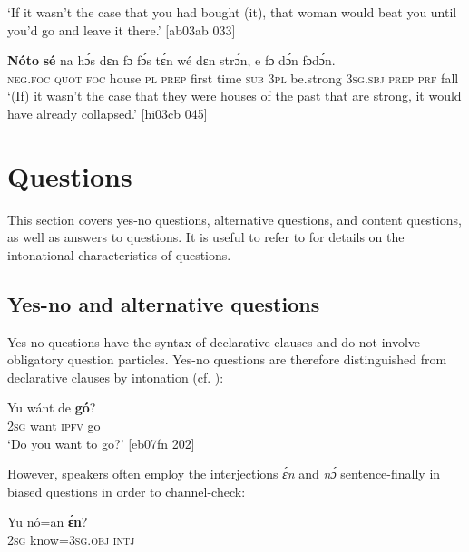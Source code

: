 \glt ‘If it wasn’t the case that you had bought (it), that woman would 
beat you until you’d go and leave it there.’ [ab03ab 033]
\z


\ea%
    \label{ex:key:581}
    \gll \textbf{Nóto}  \textbf{sé}    na  hɔ́s    dɛn  fɔ  fɔ́s  tɛ́n    wé  dɛn  strɔ́n,
e    fɔ  dɔ́n  fɔdɔ́n.\\
\textsc{neg}.\textsc{foc}  \textsc{quot}    \textsc{foc}  house  \textsc{pl}  \textsc{prep}  first time  \textsc{sub}  \textsc{3pl}  be.strong
\textsc{3sg.sbj}  \textsc{prep}  \textsc{prf}  fall\\

\glt ‘(If) it wasn’t the case that they were houses of the past that 
are strong, it would have already collapsed.’ [hi03cb 045]
\z

\section{Questions}\label{sec:7.3}

This section covers yes-no questions, alternative questions, and content questions, as well as answers to questions. It is useful to refer to  for details on the intonational characteristics of questions. 

\subsection{Yes-no and alternative questions}

Yes-no questions have the syntax of declarative clauses and do not involve obligatory question particles. Yes-no questions are therefore distinguished from declarative clauses by intonation (cf. ):


\ea%
    \label{ex:key:582}
    \gll Yu  wánt  de  \textbf{gó}?\\
\textsc{2sg}  want  \textsc{ipfv}  go\\

\glt ‘Do you want to go?’ [eb07fn 202]
\z

However, speakers often employ the interjections \textit{ɛ́n} and \textit{nɔ́} sentence-finally in biased questions in order to channel-check: 


\ea%
    \label{ex:key:583}
    \gll Yu  nó=an    \textbf{ɛ́n}?\\
\textsc{2sg}  know=\textsc{3sg.obj}  \textsc{intj}\\


